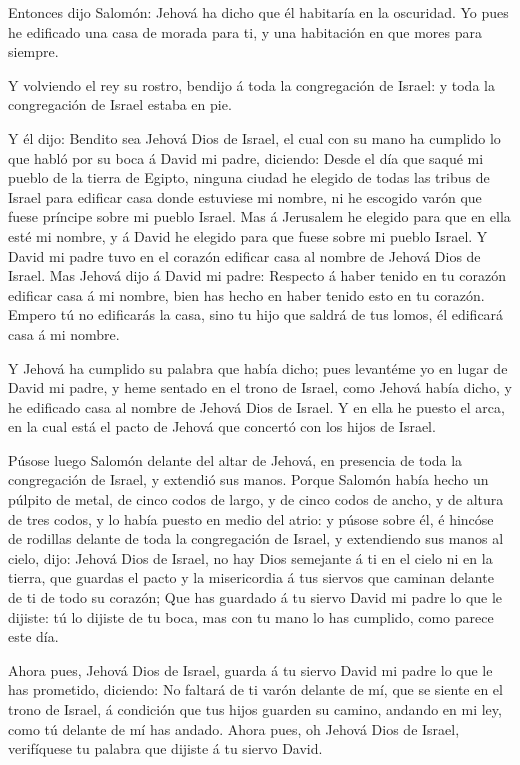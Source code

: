  Entonces dijo Salomón: Jehová ha dicho que él habitaría en
la oscuridad.  Yo pues he edificado una casa de morada para
ti, y una habitación en que mores para siempre.

 Y volviendo el rey su rostro, bendijo á toda la
congregación de Israel: y toda la congregación de Israel estaba en pie.

 Y él dijo: Bendito sea Jehová Dios de Israel, el cual con
su mano ha cumplido lo que habló por su boca á David mi padre, diciendo:
 Desde el día que saqué mi pueblo de la tierra de Egipto,
ninguna ciudad he elegido de todas las tribus de Israel para edificar
casa donde estuviese mi nombre, ni he escogido varón que fuese príncipe
sobre mi pueblo Israel.  Mas á Jerusalem he elegido para que
en ella esté mi nombre, y á David he elegido para que fuese sobre mi
pueblo Israel.  Y David mi padre tuvo en el corazón edificar
casa al nombre de Jehová Dios de Israel.  Mas Jehová dijo á
David mi padre: Respecto á haber tenido en tu corazón edificar casa á mi
nombre, bien has hecho en haber tenido esto en tu corazón. 
Empero tú no edificarás la casa, sino tu hijo que saldrá de tus lomos,
él edificará casa á mi nombre.

 Y Jehová ha cumplido su palabra que había dicho; pues
levantéme yo en lugar de David mi padre, y heme sentado en el trono de
Israel, como Jehová había dicho, y he edificado casa al nombre de Jehová
Dios de Israel.  Y en ella he puesto el arca, en la cual
está el pacto de Jehová que concertó con los hijos de Israel.

 Púsose luego Salomón delante del altar de Jehová, en
presencia de toda la congregación de Israel, y extendió sus manos.
 Porque Salomón había hecho un púlpito de metal, de cinco
codos de largo, y de cinco codos de ancho, y de altura de tres codos, y
lo había puesto en medio del atrio: y púsose sobre él, é hincóse de
rodillas delante de toda la congregación de Israel, y extendiendo sus
manos al cielo, dijo:  Jehová Dios de Israel, no hay Dios
semejante á ti en el cielo ni en la tierra, que guardas el pacto y la
misericordia á tus siervos que caminan delante de ti de todo su corazón;
 Que has guardado á tu siervo David mi padre lo que le
dijiste: tú lo dijiste de tu boca, mas con tu mano lo has cumplido, como
parece este día.

 Ahora pues, Jehová Dios de Israel, guarda á tu siervo
David mi padre lo que le has prometido, diciendo: No faltará de ti varón
delante de mí, que se siente en el trono de Israel, á condición que tus
hijos guarden su camino, andando en mi ley, como tú delante de mí has
andado.  Ahora pues, oh Jehová Dios de Israel, verifíquese
tu palabra que dijiste á tu siervo David.


